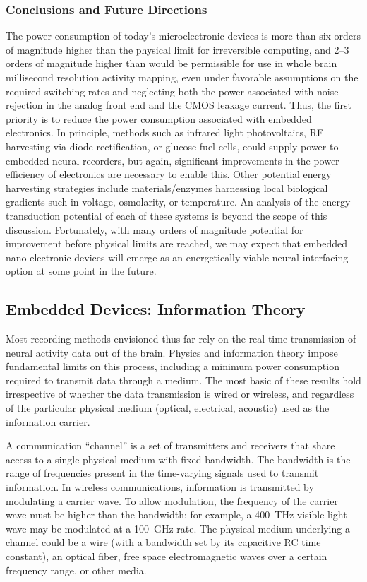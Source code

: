 \subsubsection{Conclusions and Future Directions}
The power consumption of today's microelectronic devices is more than six orders of magnitude higher than the physical limit for irreversible computing, and 2--3 orders of magnitude higher than would be permissible for use in whole brain millisecond resolution activity mapping, even under favorable assumptions on the required switching rates and neglecting both the power associated with noise rejection in the analog front end and the CMOS leakage current.
Thus, the first priority is to reduce the power consumption associated with embedded electronics.
In principle, methods such as infrared light photovoltaics, RF harvesting via diode rectification, or glucose fuel cells, could supply power to embedded neural recorders, but again, significant improvements in the power efficiency of electronics are necessary to enable this.
Other potential energy harvesting strategies include materials/enzymes harnessing local biological gradients such in voltage, osmolarity, or temperature.
An analysis of the energy transduction potential of each of these systems is beyond the scope of this discussion.
Fortunately, with many orders of magnitude potential for improvement before physical limits are reached, we may expect that embedded nano-electronic devices will emerge as an energetically viable neural interfacing option at some point in the future.

\subsection{Embedded Devices: Information Theory}

Most recording methods envisioned thus far rely on the real-time transmission of neural activity data out of the brain.
Physics and information theory impose fundamental limits on this process, including a minimum power consumption required to transmit data through a medium.
The most basic of these results hold irrespective of whether the data transmission is wired or wireless, and regardless of the particular physical medium (optical, electrical, acoustic) used as the information carrier.

A communication ``channel'' is a set of transmitters and receivers that share access to a single physical medium with fixed bandwidth.
The bandwidth is the range of frequencies present in the time-varying signals used to transmit information.
In wireless communications, information is transmitted by modulating a carrier wave.
To allow modulation, the frequency of the carrier wave must be higher than the bandwidth: for example, a \SI{400}{\tera\hertz} visible light wave may be modulated at a \SI{100}{\giga\hertz} rate.
The physical medium underlying a channel could be a wire (with a bandwidth set by its capacitive RC time constant), an optical fiber, free space electromagnetic waves over a certain frequency range, or other media.

